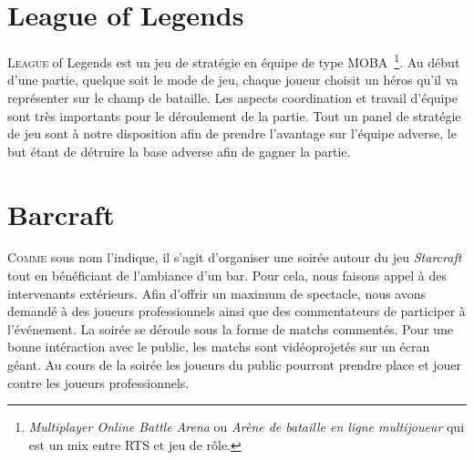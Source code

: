 
\section{League of Legends}%
\label{sec:league_of_legends}

\lettrine{L}{eague} of Legends est un jeu de stratégie en équipe de type
MOBA\, \footnote{\emph{Multiplayer Online Battle Arena} ou \emph{Arène
de bataille en ligne multijoueur} qui est un mix entre RTS et jeu de
rôle.}. Au début d'une partie, quelque soit le mode de jeu, chaque
joueur choisit un héros qu'il va représenter sur le champ de bataille.
Les aspects coordination et travail d'équipe sont très importants pour
le déroulement de la partie. Tout un panel de stratégie de jeu sont à
notre disposition afin de prendre l'avantage sur l'équipe adverse, le
but étant de détruire la base adverse afin de gagner la partie.

\section{Barcraft}%
\label{sec:barcraft}

\lettrine{C}{omme} sous nom l'indique, il s'agit d'organiser une soirée
autour du jeu \emph{Starcraft} tout en bénéficiant de l'ambiance d'un bar. Pour cela, nous
faisons appel à des intervenants extérieurs. Afin d'offrir un maximum
de spectacle, nous avons demandé à des joueurs professionnels ainsi que
des commentateurs de participer à l'événement. La soirée
se déroule sous la forme de matchs commentés. Pour une bonne intéraction
avec le public, les matchs sont vidéoprojetés sur un écran géant. Au
cours de la soirée les joueurs du public pourront prendre place et jouer
contre les joueurs professionnels.

